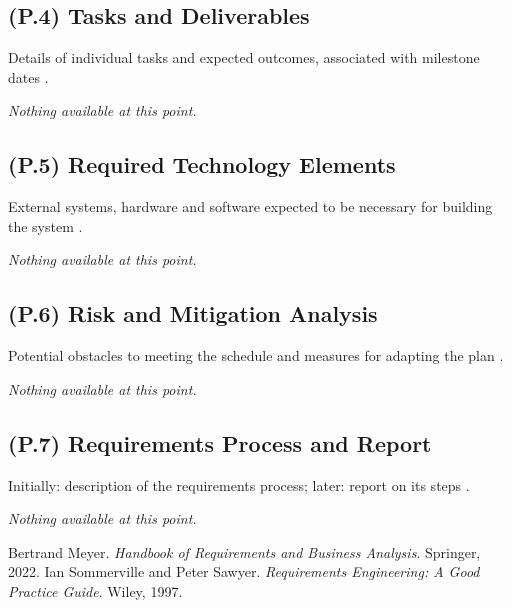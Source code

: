 \documentclass[12pt,letterpaper]{article}
\begin{document}
\subsection{(P.4) Tasks and Deliverables}
Details of individual tasks and expected outcomes, associated with milestone dates \cite{meyer2022}.

\textit{Nothing available at this point.}

\subsection{(P.5) Required Technology Elements}
External systems, hardware and software expected to be necessary for building the system \cite{meyer2022}.

\textit{Nothing available at this point.}

\subsection{(P.6) Risk and Mitigation Analysis}
Potential obstacles to meeting the schedule and measures for adapting the plan \cite{meyer2022}.

\textit{Nothing available at this point.}

\subsection{(P.7) Requirements Process and Report}
Initially: description of the requirements process; later: report on its steps \cite{meyer2022}.

\textit{Nothing available at this point.}

\clearpage

\begin{thebibliography}{9}
 Bertrand Meyer. \textit{Handbook of Requirements and Business Analysis}. Springer, 2022.
 Ian Sommerville and Peter Sawyer. \textit{Requirements Engineering: A Good Practice Guide}. Wiley, 1997.
\end{thebibliography}
\end{document}

